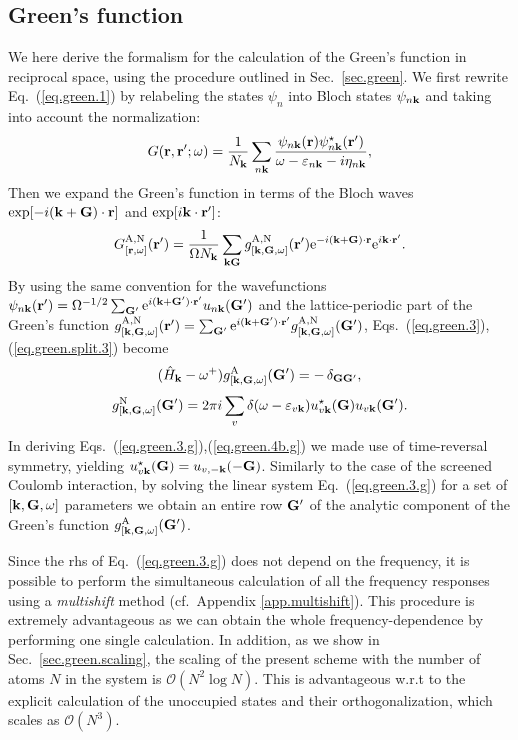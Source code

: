 \documentclass[twocolumn,prb,showpacs,superscriptaddress]{revtex4}
\def\w{\omega}
\def\H{\hat{H}}
\def\E{\varepsilon}
\def\k{{\bf k}}
\def\G{{\bf G}}
\def\Gp{{\bf G^\prime}}
\def\r{{\bf r}}
\def\rp{{\bf r^\prime}}
\begin{document}
\subsection{Green's function}\label{sec.green.g}

We here derive the formalism for the calculation of the Green's function
in reciprocal space, using the procedure outlined in Sec.\ \ref{sec.green}.
We first rewrite Eq.\ (\ref{eq.green.1}) by relabeling the states
$\psi_n$ into Bloch states $\psi_{n\k}$ and taking into account the
normalization:
  \begin{equation}\label{eq.green.1.g}
  G(\r,\rp;\w) = \frac{1}{N_\k}\sum_{n\k} \frac{\psi_{n\k}(\r)\psi_{n\k}^\star(\rp)}{\w-\E_{n\k}-i\eta_{n\k}},
  \end{equation}
Then we expand the Green's function in terms
of the Bloch waves ${\rm exp}[-i(\k+\G)\cdot\r]$ and ${\rm exp}[i\k\cdot\rp]$:
  \begin{equation}\label{eq.green.bloch}
  G^{\rm A,N}_{[\r,\w]} (\rp) = \frac{1}{\Omega N_\k}  \sum_{\k\G} g^{\rm A,N}_{[\k,\G,\w]}(\rp)
   {\rm e}^{-i(\k+\G)\cdot\r} {\rm e}^{i\k\cdot\rp}.
  \end{equation}
By using the same convention for the wavefunctions 
$\psi_{n\k}(\rp)=\Omega^{-1/2}\sum_\Gp {\rm e}^{i(\k+\Gp)\cdot\rp} u_{n\k}(\Gp)$
and the lattice-periodic part of the Green's function 
$g^{\rm A,N}_{[\k,\G,\w]}(\rp)  = \sum_\Gp {\rm e}^{i(\k+\Gp)\cdot\rp} g^{\rm A,N}_{[\k,\G,\w]}(\Gp)$,
Eqs.~(\ref{eq.green.3}),(\ref{eq.green.split.3}) become
  \begin{equation}\label{eq.green.3.g}
   (\H_\k-\w^+)  g^{\rm A}_{[\k,\G,\w]}(\Gp)  =  -\,\delta_{\G\Gp},
  \end{equation}
  \begin{equation} \label{eq.green.4b.g}
  g^{\rm N}_{[\k,\G,\w]}(\Gp)  =  
  2\pi i \sum_v \delta(\w-\E_{v\k}) u^\star_{v\k}(\G)u_{v\k} (\Gp).
  \end{equation}
In deriving Eqs.\ (\ref{eq.green.3.g}),(\ref{eq.green.4b.g}) we made use of time-reversal symmetry, yielding
$u^\star_{v\k}(\G) = u_{v,-\k}(-\G)$.
Similarly to the case of the screened Coulomb interaction, by solving the
linear system Eq.\ (\ref{eq.green.3.g}) for a set of $[\k,\G,\w]$ parameters
we obtain an entire row $\Gp$ of the analytic component of the
Green's function $g^{\rm A}_{[\k,\G,\w]}(\Gp)$.

Since the rhs of Eq.\ (\ref{eq.green.3.g}) does not depend on the frequency, 
it is possible to perform the simultaneous calculation of all the frequency responses 
using a {\it multishift} method (cf.\ Appendix \ref{app.multishift}). This procedure is extremely
advantageous as we can obtain the whole frequency-dependence by performing one
single calculation. In addition, as we show in Sec.\ \ref{sec.green.scaling},
the scaling of the present scheme with the number of atoms $N$ in the system 
is ${\mathcal O}(N^2\log N)$. This is advantageous w.r.t to the explicit calculation 
of the unoccupied states and their orthogonalization, which scales as ${\mathcal O}(N^3)$.
\end{document}
